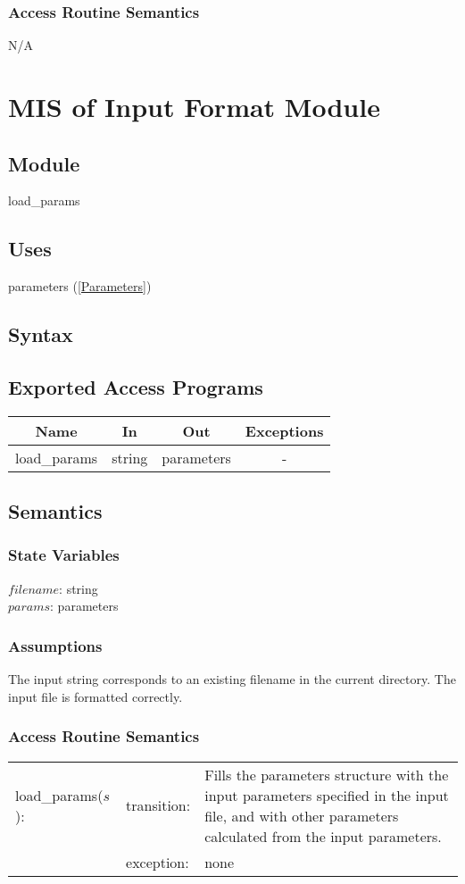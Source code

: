 \documentclass[12pt]{article}
\begin{document}
\subsubsection{Access Routine Semantics}
N/A

\section{MIS of Input Format Module} \label{Load}
\subsection{Module}
load\_params
\subsection{Uses}
parameters (\ref{Parameters})
\subsection{Syntax}
\subsection{Exported Access Programs}
\begin{center}
\begin{tabular}{c c c c}
\hline
\textbf{Name} & \textbf{In} & \textbf{Out} & \textbf{Exceptions} \\
\hline
load\_params & string & parameters &  - \\
\hline
\end{tabular}
\end{center}
\subsection{Semantics}
\subsubsection{State Variables}
$filename$: string \\
$params$: parameters
\subsubsection{Assumptions}
The input string corresponds to an existing filename in the current directory. The input file is formatted correctly.
\subsubsection{Access Routine Semantics}
\begin{center}
\begin{tabular}{l l p{12cm}}
load\_params($s$): & transition: & Fills the parameters structure with the input parameters specified in the input file, and with other parameters calculated from the input parameters. \\
& exception: & none \\
\end{tabular}
\end{center}
\end{document}
